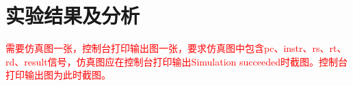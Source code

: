 \section{实验结果及分析}
\textcolor{red}{需要仿真图一张，控制台打印输出图一张，要求仿真图中包含pc、instr、rs、rt、rd、result信号，仿真图应在控制台打印输出Simulation succeeded时截图。控制台打印输出图为此时截图。}
